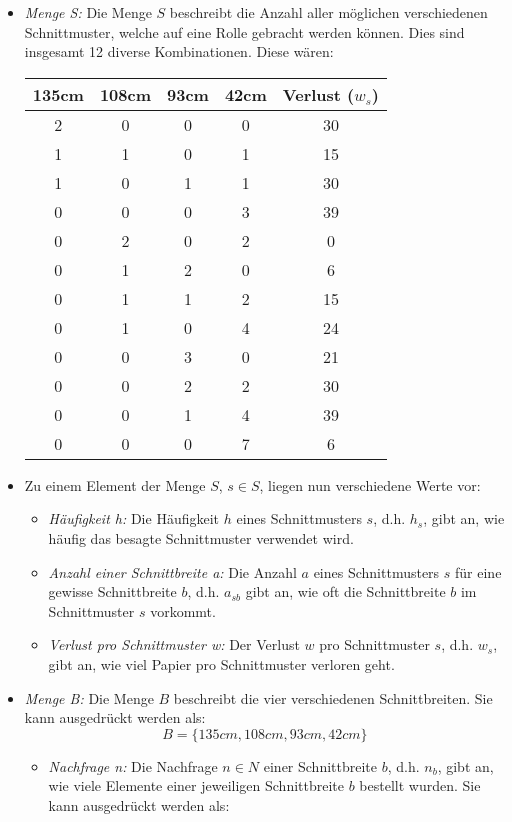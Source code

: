 \begin{itemize}
\item \emph{Menge S:} Die Menge $S$ beschreibt die Anzahl aller möglichen verschiedenen Schnittmuster, welche auf eine Rolle gebracht werden können. Dies sind insgesamt 12 diverse Kombinationen. Diese wären:

\begin{tabular}{|c|c|c|c|c|}
\hline 135cm & 108cm & 93cm & 42cm & Verlust ($w_s$) \\ 
\hline 2 & 0 & 0 & 0 & 30 \\ 
\hline 1 & 1 & 0 & 1 & 15 \\ 
\hline 1 & 0 & 1 & 1 & 30 \\ 
\hline 0 & 0 & 0 & 3 & 39 \\ 
\hline 0 & 2 & 0 & 2 & 0 \\ 
\hline 0 & 1 & 2 & 0 & 6 \\ 
\hline 0 & 1 & 1 & 2 & 15 \\ 
\hline 0 & 1 & 0 & 4 & 24 \\
\hline 0 & 0 & 3 & 0 & 21 \\ 
\hline 0 & 0 & 2 & 2 & 30 \\ 
\hline 0 & 0 & 1 & 4 & 39 \\ 
\hline 0 & 0 & 0 & 7 & 6 \\ 
\hline 
\end{tabular} 

\item Zu einem Element der Menge $S$, $s \in S$, liegen nun verschiedene Werte vor:
\begin{itemize}
\item \emph{Häufigkeit h:} Die Häufigkeit $h$ eines Schnittmusters $s$, d.h. $h_s$, gibt an, wie häufig das besagte Schnittmuster verwendet wird.
\item \emph{Anzahl einer Schnittbreite a:}	Die Anzahl $a$ eines Schnittmusters $s$ für eine gewisse Schnittbreite $b$, d.h. $a_{sb}$ gibt an, wie oft die Schnittbreite $b$ im Schnittmuster $s$ vorkommt.
\item \emph{Verlust pro Schnittmuster w:} Der Verlust $w$ pro Schnittmuster $s$, d.h. $w_s$, gibt an, wie viel Papier pro Schnittmuster verloren geht.
\end{itemize}
\item \emph{Menge B:} Die Menge $B$ beschreibt die vier verschiedenen Schnittbreiten. Sie kann ausgedrückt werden als: 
\[ B = \{135cm,108cm,93cm,42cm\} \]
\begin{itemize}
\item \emph{Nachfrage n:} Die Nachfrage $n \in N$ einer Schnittbreite $b$, d.h. $n_b$, gibt an, wie viele Elemente einer jeweiligen Schnittbreite $b$ bestellt wurden. Sie kann ausgedrückt werden als: 


\end{itemize}
\end{itemize}
